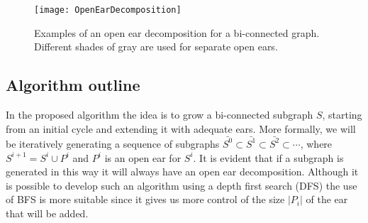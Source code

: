 \begin{figure}[tcb]
\centering
\texttt{[image: OpenEarDecomposition]}
\caption{Examples of an open ear decomposition for a bi-connected graph. Different shades of gray are used for separate open ears.}
\label{fig:OpenEarDecomposition}
\end{figure} 
\subsection{Algorithm outline}
In the proposed algorithm the idea is to grow a bi-connected subgraph $S$, starting from an initial cycle and extending it with adequate ears.  More formally, we will be iteratively generating a sequence of subgraphs $\bar{S^0} \subset \bar{S^1} \subset \bar{S^2}\subset \cdots$, where $S^{i+1} = S^{i} \cup P^i$ and $P^i$ is an open ear for $S^i$.  It is evident that if a subgraph is generated in this way it will always have an open ear decomposition. Although  it  is possible to develop such an algorithm using a depth first search (DFS) the use of BFS is more suitable since it gives us more control of the size $|P_i|$ of the ear that will be added.  

